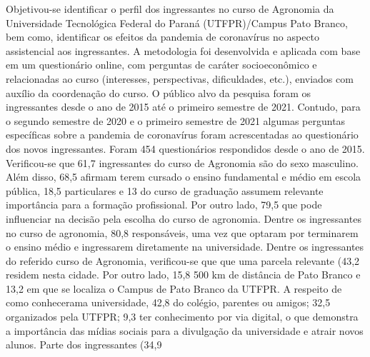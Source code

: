 Objetivou-se identificar o perfil dos ingressantes no curso de Agronomia da Universidade
Tecnológica Federal do Paraná (UTFPR)/Campus Pato Branco, bem como, identificar os efeitos
da pandemia de coronavírus no aspecto assistencial aos ingressantes. A metodologia foi
desenvolvida e aplicada com base em um questionário online, com perguntas de caráter
socioeconômico e relacionadas ao curso (interesses, perspectivas, dificuldades, etc.), enviados com
auxílio da coordenação do curso. O público alvo da pesquisa foram os ingressantes desde o ano de
2015 até o primeiro semestre de 2021. Contudo, para o segundo semestre de 2020 e o primeiro
semestre de 2021 algumas perguntas específicas sobre a pandemia de coronavírus foram
acrescentadas ao questionário dos novos ingressantes.
Foram 454 questionários respondidos desde o ano de 2015. Verificou-se que 61,7%
ingressantes do curso de Agronomia são do sexo masculino. Além disso, 68,5%
afirmam terem cursado o ensino fundamental e médio em escola pública, 18,5%
particulares e 13%
do curso de graduação assumem relevante importância para a formação profissional. Por outro
lado, 79,5%
que pode influenciar na decisão pela escolha do curso de agronomia. Dentre os ingressantes no
curso de agronomia, 80,8%
responsáveis, uma vez que optaram por terminarem o ensino médio e ingressarem diretamente na
universidade.
Dentre os ingressantes do referido curso de Agronomia, verificou-se que que uma parcela
relevante (43,2%
residem nesta cidade. Por outro lado, 15,8%
500 km de distância de Pato Branco e 13,2%
em que se localiza o Campus de Pato Branco da UTFPR. A respeito de como conhecerama 
universidade, 42,8%
do colégio, parentes ou amigos; 32,5%
organizados pela UTFPR; 9,3%
ter conhecimento por via digital, o que demonstra a importância das mídias sociais para a
divulgação da universidade e atrair novos alunos.
Parte dos ingressantes (34,9%

